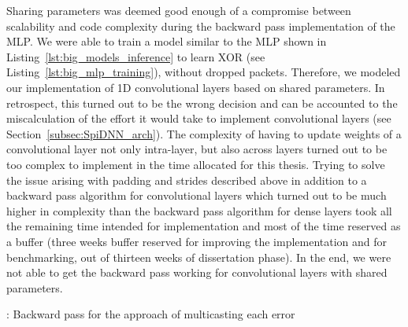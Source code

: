 \documentclass[]{article}
\begin{document}
Sharing parameters was deemed good enough of a compromise between
scalability and code complexity during the backward pass
implementation of the MLP.
We were able to train a model similar to the MLP shown in
Listing~\ref{lst:big_models_inference} to learn XOR
(see Listing~\ref{lst:big_mlp_training}), without dropped packets.
Therefore, we modeled our implementation of 1D convolutional layers
based on shared parameters.
In retrospect, this turned out to be the wrong decision and can be
accounted to the miscalculation of the effort it would take to
implement convolutional layers (see Section~\ref{subsec:SpiDNN_arch}).
The complexity of having to update weights of a convolutional layer
not only intra-layer, but also across layers turned out to be too
complex to implement in the time allocated for this thesis.
Trying to solve the issue arising with padding and strides described
above in addition to a backward pass algorithm for convolutional
layers which turned out to be much higher in complexity than the
backward pass algorithm for dense layers took all the remaining time
intended for implementation and most of the time reserved as a
buffer (three weeks buffer reserved for improving the implementation
and for benchmarking, out of thirteen weeks of dissertation phase).
In the end, we were not able to get the backward pass working for
convolutional layers with shared parameters.

\begin{algorithm} %
  \caption{: Backward pass for the approach of multicasting each
    error}
  \label{alg:multicast_error}

  \begin{algorithmic}[1]
    \ENDFOR
  \end{algorithmic}
\end{algorithm} %
\end{document}
